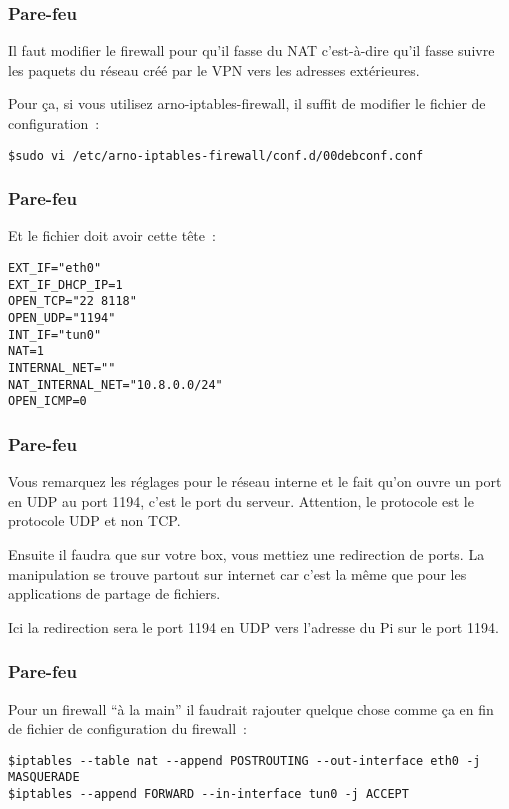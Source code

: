 \begin{frame}[containsverbatim]
\frametitle{Pare-feu}

Il faut modifier le firewall pour qu'il fasse du NAT c'est-à-dire qu'il fasse suivre les paquets du réseau créé par le VPN vers les adresses extérieures. 

Pour ça, si vous utilisez arno-iptables-firewall, il suffit de modifier le fichier de configuration~:
\begin{verbatim}
$sudo vi /etc/arno-iptables-firewall/conf.d/00debconf.conf
\end{verbatim}

\end{frame}

\begin{frame}[containsverbatim]
\frametitle{Pare-feu}

Et le fichier doit avoir cette tête~:
\begin{verbatim}
EXT_IF="eth0"
EXT_IF_DHCP_IP=1
OPEN_TCP="22 8118"
OPEN_UDP="1194"
INT_IF="tun0"
NAT=1
INTERNAL_NET=""
NAT_INTERNAL_NET="10.8.0.0/24"
OPEN_ICMP=0
\end{verbatim}

\end{frame}

\begin{frame}[containsverbatim]
\frametitle{Pare-feu}

Vous remarquez les réglages pour le réseau interne et le fait qu'on ouvre un port en UDP au port 1194, c'est le port du serveur. Attention, le protocole est le protocole UDP et non TCP.

Ensuite il faudra que sur votre box, vous mettiez une redirection de ports. La manipulation se trouve partout sur internet car c'est la même que pour les applications de partage de fichiers.

Ici la redirection sera le port 1194 en UDP vers l'adresse du Pi sur le port 1194.

\end{frame}

\begin{frame}[containsverbatim]
\frametitle{Pare-feu}

Pour un firewall ``à la main'' il faudrait rajouter quelque chose comme ça en fin de fichier de configuration du firewall~:
\begin{verbatim}
$iptables --table nat --append POSTROUTING --out-interface eth0 -j MASQUERADE
$iptables --append FORWARD --in-interface tun0 -j ACCEPT
\end{verbatim}

\end{frame}

